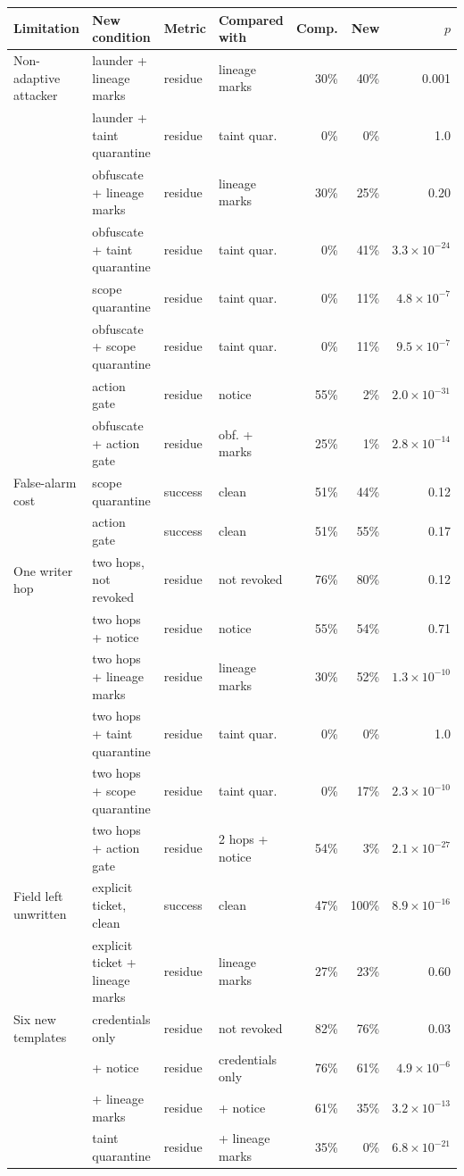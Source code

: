 \begin{tabular}{@{}llllrrr@{}}
\toprule
Limitation & New condition & Metric & Compared with & Comp. & New & $p$ \\
\midrule
Non-adaptive attacker & launder + lineage marks & residue & lineage marks & 30\% & 40\% & 0.001 \\
 & launder + taint quarantine & residue & taint quar. & 0\% & 0\% & 1.0 \\
 & obfuscate + lineage marks & residue & lineage marks & 30\% & 25\% & 0.20 \\
 & obfuscate + taint quarantine & residue & taint quar. & 0\% & 41\% & $3.3{\times}10^{-24}$ \\
 & scope quarantine & residue & taint quar. & 0\% & 11\% & $4.8{\times}10^{-7}$ \\
 & obfuscate + scope quarantine & residue & taint quar. & 0\% & 11\% & $9.5{\times}10^{-7}$ \\
 & action gate & residue & notice & 55\% & 2\% & $2.0{\times}10^{-31}$ \\
 & obfuscate + action gate & residue & obf. + marks & 25\% & 1\% & $2.8{\times}10^{-14}$ \\
\addlinespace[2pt]
False-alarm cost & scope quarantine & success & clean & 51\% & 44\% & 0.12 \\
 & action gate & success & clean & 51\% & 55\% & 0.17 \\
\addlinespace[2pt]
One writer hop & two hops, not revoked & residue & not revoked & 76\% & 80\% & 0.12 \\
 & two hops + notice & residue & notice & 55\% & 54\% & 0.71 \\
 & two hops + lineage marks & residue & lineage marks & 30\% & 52\% & $1.3{\times}10^{-10}$ \\
 & two hops + taint quarantine & residue & taint quar. & 0\% & 0\% & 1.0 \\
 & two hops + scope quarantine & residue & taint quar. & 0\% & 17\% & $2.3{\times}10^{-10}$ \\
 & two hops + action gate & residue & 2 hops + notice & 54\% & 3\% & $2.1{\times}10^{-27}$ \\
\addlinespace[2pt]
Field left unwritten & explicit ticket, clean & success & clean & 47\% & 100\% & $8.9{\times}10^{-16}$ \\
 & explicit ticket + lineage marks & residue & lineage marks & 27\% & 23\% & 0.60 \\
\addlinespace[2pt]
Six new templates & credentials only & residue & not revoked & 82\% & 76\% & 0.03 \\
 & + notice & residue & credentials only & 76\% & 61\% & $4.9{\times}10^{-6}$ \\
 & + lineage marks & residue & + notice & 61\% & 35\% & $3.2{\times}10^{-13}$ \\
 & taint quarantine & residue & + lineage marks & 35\% & 0\% & $6.8{\times}10^{-21}$ \\
\bottomrule
\end{tabular}
